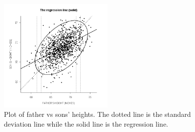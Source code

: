\documentclass[12pt]{../notes}
\begin{document}
\begin{figure}[H]
\centering
\includegraphics[width=0.5\textwidth]{../figures/module1/heightScatter.png}
\caption{Plot of father vs sons' heights. The dotted line is the standard deviation line while the solid line is the regression line.}
\end{figure}
\end{document}

